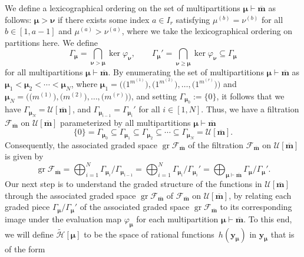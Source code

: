 \documentclass[pdftex]{sigma}
\numberwithin{equation}{section}
\DeclareMathOperator{\gr}{gr}
\begin{document}
We define a lexicographical ordering on the set of multipartitions $\bm{\mu}\vdash\overline{\mathbf{m}}$ as follows: $\bm{\mu}>\bm{\nu}$ if there exists some index $a\in I_r$ satisfying $\mu^{(b)}=\nu^{(b)}$ for all $b\in[1,a-1]$ and $\mu^{(a)}>\nu^{(a)}$, where we take the lexicographical ordering on partitions here. We define
\begin{equation*}
\Gamma_{\bm{\mu}}=\bigcap_{\bm{\nu}>\bm{\mu}}\ker\varphi_{\bm{\nu}},\qquad\Gamma_{\bm{\mu}}'=\bigcap_{\bm{\nu}\geq\bm{\mu}}\ker\varphi_{\bm{\nu}}\subseteq\Gamma_{\bm{\mu}}
\end{equation*}
for all multipartitions $\bm{\mu}\vdash\overline{\mathbf{m}}$. By enumerating the set of multipartitions $\bm{\mu}\vdash \overline{\mathbf{m}}$ as $\bm{\mu}_1<\bm{\mu}_2<\cdots< \bm{\mu}_N$, where $\bm{\mu}_1=\bigl(\bigl(1^{m^{(1)}}\bigr),\bigl(1^{m^{(2)}}\bigr), \dots,\bigl(1^{m^{(r)}}\bigr)\bigr)$ and $\bm{\mu}_N=\bigl(\bigl(m^{(1)}\bigr),\bigl(m^{(2)}\bigr), \dots,\bigl(m^{(r)}\bigr)\bigr)$, and setting $\Gamma_{\bm{\mu}_0}:=\{0\}$, it follows that we have $\Gamma_{\bm{\mu}_N}=\mathcal{U}[\overline{\mathbf{m}}]$, and $\Gamma_{\bm{\mu}_{i-1}}= \Gamma_{\bm{\mu}_i}'$ for all $i\in [1,N]$. Thus, we have a filtration $\mathcal{F}_{\overline{\mathbf{m}}}$ on $\mathcal{U}[\overline{\mathbf{m}}]$ parameterized by all multipartitions $\bm{\mu}\vdash \overline{\mathbf{m}}$
\begin{equation*}
\{0\}=\Gamma_{\bm{\mu}_0}\subseteq\Gamma_{\bm{\mu}_1} \subseteq \Gamma_{\bm{\mu}_2}\subseteq\cdots\subseteq \Gamma_{\bm{\mu}_N}=\mathcal{U}[\overline{\mathbf{m}}].
\end{equation*}
Consequently, the associated graded space $\gr\mathcal{F}_{\overline{\mathbf{m}}}$ of the filtration $\mathcal{F}_{\overline{\mathbf{m}}}$ on $\mathcal{U}[\overline{\mathbf{m}}]$ is given by
\begin{equation}\label{eq:3.23}
\gr\mathcal{F}_{\overline{\mathbf{m}}}
=\bigoplus_{i=1}^N\Gamma_{\bm{\mu}_i}/\Gamma_{\bm{\mu}_{i-1}}
=\bigoplus_{i=1}^N\Gamma_{\bm{\mu}_i}/\Gamma_{\bm{\mu}_i}'
=\bigoplus_{\bm{\mu}\vdash\overline{\mathbf{m}}} \Gamma_{\bm{\mu}}/\Gamma_{\bm{\mu}}'.
\end{equation}
Our next step is to understand the graded structure of the functions in $\mathcal{U}[\overline{\mathbf{m}}]$ through the associated graded space $\gr\mathcal{F}_{\overline{ \mathbf{m}}}$ of $\mathcal{F}_{\overline{\mathbf{m}}}$ on $\mathcal{U}[\overline{\mathbf{m}}]$, by relating each graded piece $\Gamma_{\bm{\mu}}/\Gamma_{\bm{\mu}}'$ of the associated graded space $\gr\mathcal{F}_{\overline{\mathbf{m}}}$ to its corresponding image under the evaluation map $\varphi_{\bm{ \mu}}$ for each multipartition $\bm{\mu}\vdash\overline{ \mathbf{m}}$. To this end, we will define $\tilde{\mathcal{H}}[\bm{\mu}]$ to be the space of rational functions~$h(\mathbf{ y}_{\bm{\mu}})$ in $\mathbf{y}_{\bm{\mu}}$ that is of the form
\end{document}
